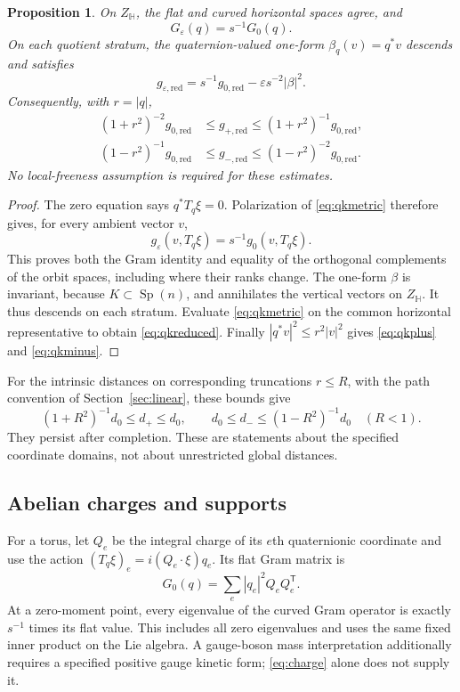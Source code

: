 \documentclass[11pt]{amsart}
\newtheorem{proposition}[theorem]{Proposition}
\theoremstyle{definition}
\theoremstyle{remark}
\newcommand{\Hh}{\mathbb H}
\newcommand{\Sp}{\operatorname{Sp}}
\begin{document}
\begin{proposition}\label{prop:qk}
On $Z_\Hh$, the flat and curved horizontal spaces agree, and
\begin{equation}\label{eq:qkgram}
 G_\varepsilon(q)=s^{-1}G_0(q).
\end{equation}
On each quotient stratum, the quaternion-valued one-form
$\beta_q(v)=q^*v$ descends and satisfies
\begin{equation}\label{eq:qkreduced}
 g_{\varepsilon,\mathrm{red}}
     =s^{-1}g_{0,\mathrm{red}}-\varepsilon s^{-2}|\beta|^2.
\end{equation}
Consequently, with $r=|q|$,
\begin{align}
 (1+r^2)^{-2}g_{0,\mathrm{red}}
   &\leq g_{+,\mathrm{red}}
     \leq(1+r^2)^{-1}g_{0,\mathrm{red}},\label{eq:qkplus}\\
 (1-r^2)^{-1}g_{0,\mathrm{red}}
   &\leq g_{-,\mathrm{red}}
     \leq(1-r^2)^{-2}g_{0,\mathrm{red}}.\label{eq:qkminus}
\end{align}
No local-freeness assumption is required for these estimates.
\end{proposition}

\begin{proof}
The zero equation says $q^*T_q\xi=0$. Polarization of
\eqref{eq:qkmetric} therefore gives, for every ambient vector $v$,
\[
 g_\varepsilon(v,T_q\xi)=s^{-1}g_0(v,T_q\xi).
\]
This proves both the Gram identity and equality of the orthogonal
complements of the orbit spaces, including where their ranks change.
The one-form $\beta$ is invariant, because $K\subset\Sp(n)$,
and annihilates the vertical vectors on $Z_\Hh$. It thus descends
on each stratum. Evaluate \eqref{eq:qkmetric} on the common
horizontal representative to obtain \eqref{eq:qkreduced}.
Finally $|q^*v|^2\leq r^2|v|^2$ gives
\eqref{eq:qkplus} and \eqref{eq:qkminus}.
\end{proof}

For the intrinsic distances on corresponding truncations $r\leq R$,
with the path convention of Section~\ref{sec:linear}, these bounds give
\[
 (1+R^2)^{-1}d_0\leq d_+\leq d_0,
 \qquad
 d_0\leq d_-\leq(1-R^2)^{-1}d_0\quad(R<1).
\]
They persist after completion. These are statements about the
specified coordinate domains, not about unrestricted global distances.

\subsection{Abelian charges and supports}
For a torus, let $Q_e$ be the integral charge of its $e$th quaternionic
coordinate and use the action
$(T_q\xi)_e=i(Q_e\cdot\xi)q_e$. Its flat Gram matrix is
\begin{equation}\label{eq:charge}
 G_0(q)=\sum_e|q_e|^2Q_eQ_e^{\mathsf T}.
\end{equation}
At a zero-moment point, every eigenvalue of the curved Gram operator
is exactly $s^{-1}$ times its flat value. This includes all zero
eigenvalues and uses the same fixed inner product on the Lie algebra.
A gauge-boson mass interpretation additionally requires a specified
positive gauge kinetic form; \eqref{eq:charge} alone does not supply it.
\end{document}

